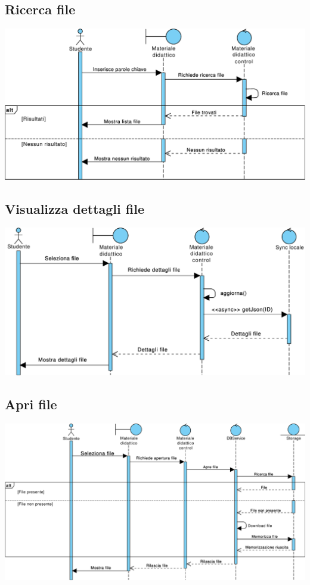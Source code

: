 \subsection{Ricerca file}
\begin{center}
	\includegraphics[width=6.5in]{imgs/gruppo1/sequence_diagrams/SD14_ricerca_file.pdf}
\end{center}
\newpage


\subsection{Visualizza dettagli file}
\begin{center}
	\includegraphics[width=6.5in]{imgs/gruppo1//sequence_diagrams/SD15_visualizza_dettagli_file.pdf}
\end{center}
\subsection{Apri file}
\begin{center}
	\includegraphics[width=6.5in]{imgs/gruppo1/sequence_diagrams/SD16_apri_file.pdf}
\end{center}
\newpage


